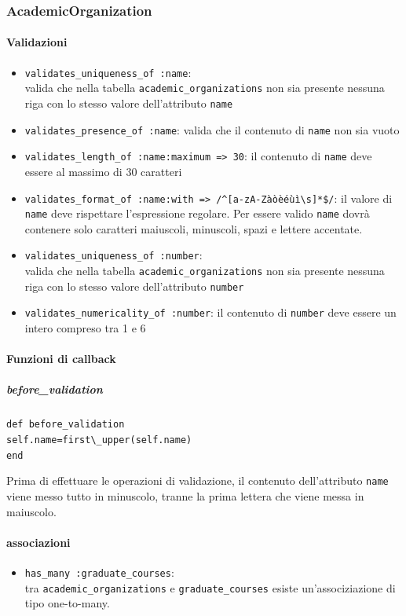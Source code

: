 \documentclass[11pt,a4paper]{article}
\begin{document}
\subsubsection{AcademicOrganization}
\paragraph{Validazioni}
\begin{itemize}
 \item \verb|validates_uniqueness_of :name|:\\ valida che nella tabella \verb|academic_organizations| non sia presente nessuna riga con lo stesso valore dell'attributo \verb|name| 
\item \verb|validates_presence_of :name|: valida che il contenuto di \verb|name| non sia vuoto
\item \verb|validates_length_of :name:maximum => 30|: il contenuto di \verb|name| deve essere al massimo di 30 caratteri
\item \verb|validates_format_of :name:with => /^[a-zA-Zàòèéùì\s]*$/|: il valore di \verb|name| deve rispettare l'espressione regolare. Per essere valido \verb|name| dovrà contenere solo caratteri maiuscoli, minuscoli, spazi e lettere accentate.
\item \verb|validates_uniqueness_of :number|:\\ valida che nella tabella \verb|academic_organizations| non sia presente nessuna riga con lo stesso valore dell'attributo \verb|number|
 \item \verb|validates_numericality_of :number|: il contenuto di \verb|number| deve essere un intero compreso tra 1 e 6
\end{itemize}
\paragraph{Funzioni di callback}
\subparagraph{before\_validation}
\begin{center}
 \verb|def before_validation|\\
   \verb|self.name=first\_upper(self.name)|\\
 \verb|end|
\end{center}
Prima di effettuare le operazioni di validazione, il contenuto dell'attributo \verb|name| viene messo tutto in minuscolo, tranne la prima lettera che viene messa in maiuscolo. 
\paragraph{associazioni}
\begin{itemize}
\item \verb|has_many :graduate_courses|: \\tra \verb|academic_organizations| e \verb|graduate_courses| esiste un'associziazione di tipo one-to-many. 
\end{itemize}
\end{document}
